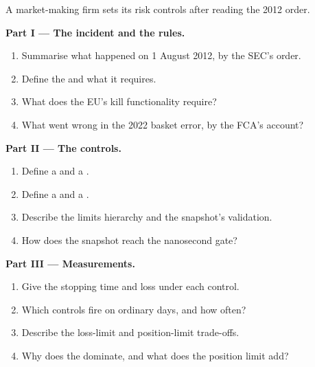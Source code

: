 \begin{problem}\label{pb:hf:risk-controls:1}
A market-making firm sets its risk controls after reading the 2012 order.

\medskip\noindent\textbf{Part I --- The incident and the rules.}
\begin{enumerate}
\item Summarise what happened on 1 August 2012, by the SEC's order.
\item Define the  and what it requires.
\item What does the EU's kill functionality require?
\item What went wrong in the 2022 basket error, by the FCA's account?
\end{enumerate}

\medskip\noindent\textbf{Part II --- The controls.}
\begin{enumerate}[resume]
\item Define a  and a .
\item Define a  and a .
\item Describe the limits hierarchy and the snapshot's validation.
\item How does the snapshot reach the nanosecond gate?
\end{enumerate}

\medskip\noindent\textbf{Part III --- Measurements.}
\begin{enumerate}[resume]
\item Give the stopping time and loss under each control.
\item Which controls fire on ordinary days, and how often?
\item Describe the loss-limit and position-limit trade-offs.
\item Why does the  dominate, and what does the position limit add?
\end{enumerate}


\end{problem}
